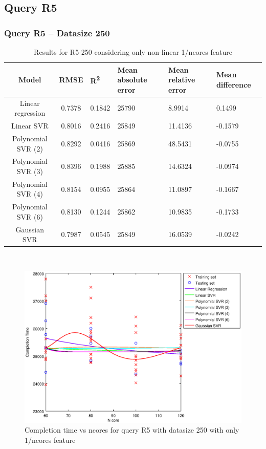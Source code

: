 \documentclass[a4paper,11pt]{article}
\begin{document}
\newpage
\subsection{Query R5}
\subsubsection{Query R5 -- Datasize 250}
\begin{table}[H]
	\centering
	\begin{adjustbox}{center}
		\begin{tabular}{c | c M{1.2cm} M{2.5cm} M{2.5cm} M{1.8cm}}
			Model & RMSE & R\textsuperscript{2} & Mean absolute error & Mean relative error & Mean difference \tabularnewline
			\hline
			Linear regression & 0.7378 & 0.1842 &  25790 & 8.9914 & 0.1499 \\
			Linear SVR & 0.8016 & 0.2416 &  25849 & 11.4136 & -0.1579 \\
			Polynomial SVR (2) & 0.8292 & 0.0416 &  25869 & 48.5431 & -0.0755 \\
			Polynomial SVR (3) & 0.8396 & 0.1988 &  25885 & 14.6324 & -0.0974 \\
			Polynomial SVR (4) & 0.8154 & 0.0955 &  25864 & 11.0897 & -0.1667 \\
			Polynomial SVR (6) & 0.8130 & 0.1244 &  25862 & 10.9835 & -0.1733 \\
			Gaussian SVR & 0.7987 & 0.0545 &  25849 & 16.0539 & -0.0242 \\
		\end{tabular}
	\end{adjustbox}
	\\
	\caption{Results for R5-250 considering only non-linear 1/ncores feature}
	\label{table_R5_prediction_all}
\end{table}

\begin {figure}[hbtp]
\centering
\includegraphics[width=\textwidth]{output/R5_250_ONLY_1_OVER_NCORES/plot_R5_250.eps}
\caption {Completion time vs ncores for query R5 with datasize 250 with only 1/ncores feature}
\end {figure}
\end{document}

